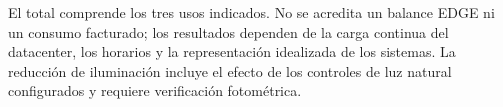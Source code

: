El total comprende los tres usos indicados. No se acredita un balance EDGE ni un consumo facturado; los resultados dependen de la carga continua del datacenter, los horarios y la representación idealizada de los sistemas. La reducción de iluminación incluye el efecto de los controles de luz natural configurados y requiere verificación fotométrica.